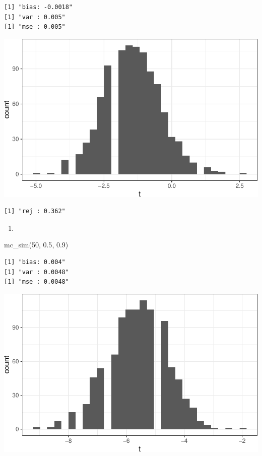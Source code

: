 \documentclass[
  letterpaper,
  DIV=11,
  numbers=noendperiod]{scrreprt}
\newenvironment{Shaded}{\begin{snugshade}}{\end{snugshade}}
\newcommand{\DecValTok}[1]{\textcolor[rgb]{0.68,0.00,0.00}{#1}}
\newcommand{\FloatTok}[1]{\textcolor[rgb]{0.68,0.00,0.00}{#1}}
\newcommand{\FunctionTok}[1]{\textcolor[rgb]{0.28,0.35,0.67}{#1}}
\newcommand{\NormalTok}[1]{\textcolor[rgb]{0.00,0.23,0.31}{#1}}
\providecommand{\tightlist}{%
  \setlength{\itemsep}{0pt}\setlength{\parskip}{0pt}}\usepackage{longtable,booktabs,array}
\begin{document}
\begin{verbatim}
[1] "bias: -0.0018"
[1] "var : 0.005"
[1] "mse : 0.005"
\end{verbatim}

\includegraphics{07-inference_files/figure-pdf/unnamed-chunk-12-1.pdf}

\begin{verbatim}
[1] "rej : 0.362"
\end{verbatim}

\begin{enumerate}
\def\labelenumi{\arabic{enumi}.}
\setcounter{enumi}{5}
\tightlist
\item
\end{enumerate}

\begin{Shaded}
\begin{Highlighting}[]
\FunctionTok{mc\_sim}\NormalTok{(}\DecValTok{50}\NormalTok{, }\FloatTok{0.5}\NormalTok{, }\FloatTok{0.9}\NormalTok{)}
\end{Highlighting}
\end{Shaded}

\begin{verbatim}
[1] "bias: 0.004"
[1] "var : 0.0048"
[1] "mse : 0.0048"
\end{verbatim}

\includegraphics{07-inference_files/figure-pdf/unnamed-chunk-13-1.pdf}
\end{document}
